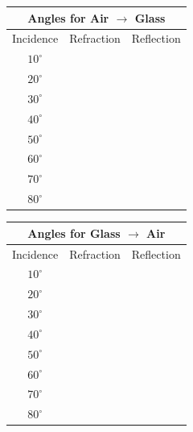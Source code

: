 \documentclass[10pt]{exam}
\begin{document}
\begin{multicols}{2}
  \begin{tabular}{|c|c|c|}
    \hline
    \multicolumn{3}{|c|}{Angles for {\bf Air $\rightarrow$ Glass}} 
    \\\hline
    Incidence &
    Refraction &
    Reflection \\\hline
    $10^\circ$ && \\\hline
    $20^\circ$ && \\\hline
    $30^\circ$ && \\\hline
    $40^\circ$ && \\\hline
    $50^\circ$ && \\\hline
    $60^\circ$ && \\\hline
    $70^\circ$ && \\\hline
    $80^\circ$ && \\\hline
  \end{tabular}

  \columnbreak

  \begin{tabular}{|c|c|c|}
    \hline
    \multicolumn{3}{|c|}{Angles for {\bf Glass $\rightarrow$ Air}} 
    \\\hline
    Incidence &
    Refraction &
    Reflection \\\hline
    $10^\circ$ && \\\hline
    $20^\circ$ && \\\hline
    $30^\circ$ && \\\hline
    $40^\circ$ && \\\hline
    $50^\circ$ && \\\hline
    $60^\circ$ && \\\hline
    $70^\circ$ && \\\hline
    $80^\circ$ && \\\hline
  \end{tabular}


\end{multicols}
\end{document}
